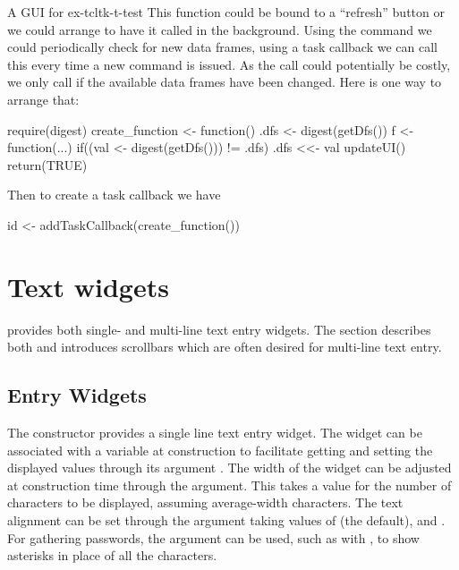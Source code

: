 \begin{example}{A GUI for }{ex-tcltk-t-test}
This function could be bound to a ``refresh'' button or we could
arrange to have it called in the background. Using the 
command we could periodically check for new data frames, using a task
callback we can call this every time a new command is issued.  As the
call could potentially be costly, we only call if the available data
frames have been changed. Here is one way to arrange that:
\begin{Schunk}
\begin{Sinput}
 require(digest)
 create_function <- function() {
   .dfs <- digest(getDfs())
   f <- function(...) {
     if((val <- digest(getDfs())) != .dfs) {
       .dfs <<- val
       updateUI()
     }
     return(TRUE)
   }
 }
\end{Sinput}
\end{Schunk}
Then to create a task callback we have
\begin{Schunk}
\begin{Sinput}
 id <- addTaskCallback(create_function())
\end{Sinput}
\end{Schunk}

\end{example}


\section{Text widgets}
\label{sec:tcltk:text-widgets}
\Tk\/ provides both single- and multi-line text entry widgets. The
section describes both and introduces scrollbars which are often
desired for multi-line text entry.

\subsection{Entry Widgets}
\label{sec:tcltk:entry-widgets}

The  constructor provides a single line text
entry widget. The widget can be associated with a \TCL\/ variable at
construction to facilitate getting and setting the displayed values
through its argument . The width of
the widget can be adjusted at construction time through the
 argument. This takes a value for the number
of characters to be displayed, assuming average-width characters.  The
text alignment can be set through the 
argument taking values of  (the default), 
and . For gathering passwords, the argument
 can be used, such as with
\qcode{*}, to show asterisks in place of all the
characters.

